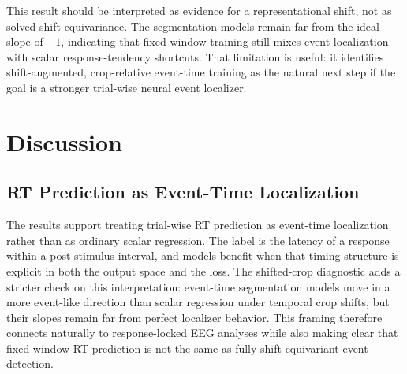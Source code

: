 \documentclass[12pt]{article}
\begin{document}
This result should be interpreted as evidence for a representational shift, not as solved shift equivariance. The segmentation models remain far from the ideal slope of $-1$, indicating that fixed-window training still mixes event localization with scalar response-tendency shortcuts. That limitation is useful: it identifies shift-augmented, crop-relative event-time training as the natural next step if the goal is a stronger trial-wise neural event localizer.

\begin{table}[!t]
\centering
\caption{Shifted-crop diagnostic on the R11 common-inside subset. The ideal within-crop event localizer has raw shift slope $-1$; a crop-invariant scalar shortcut has slope 0. Reference nRMSE is computed at the standard $s=0.5$~s crop.}
\label{tab:shifted_crop_diagnostic}
\scriptsize
\setlength{\tabcolsep}{3pt}
\renewcommand{\arraystretch}{1.12}
\end{table}

\section{Discussion}

\subsection{RT Prediction as Event-Time Localization}

The results support treating trial-wise RT prediction as event-time localization rather than as ordinary scalar regression. The label is the latency of a response within a post-stimulus interval, and models benefit when that timing structure is explicit in both the output space and the loss. The shifted-crop diagnostic adds a stricter check on this interpretation: event-time segmentation models move in a more event-like direction than scalar regression under temporal crop shifts, but their slopes remain far from perfect localizer behavior. This framing therefore connects naturally to response-locked EEG analyses while also making clear that fixed-window RT prediction is not the same as fully shift-equivariant event detection.
\end{document}
